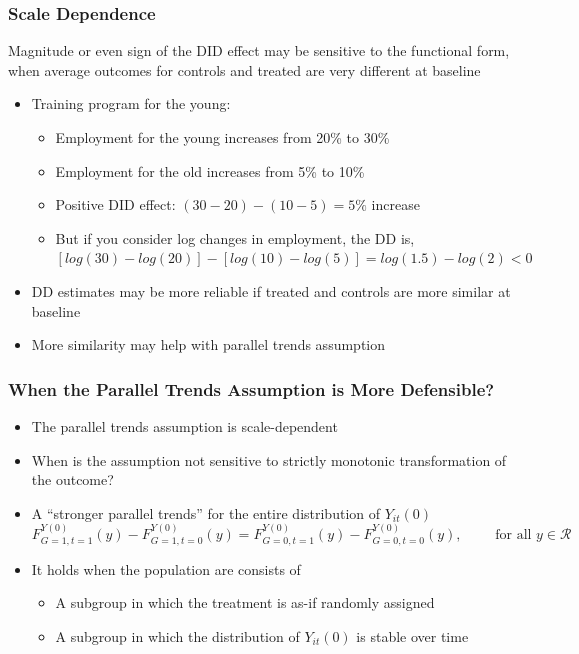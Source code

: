 \documentclass[xcolor=svgnames,9pt,english, aspectratio=169]{beamer}
\begin{document}
\begin{frame}
  \frametitle{Scale Dependence}
Magnitude or even sign of the DID effect may be sensitive to the functional form, when average outcomes for controls and treated are very different at baseline
 \begin{itemize}\bigskip
 \item Training program for the young:\medskip
 \begin{itemize}
   \item Employment for the young increases from 20\% to 30\%
   \item Employment for the old increases from 5\% to 10\%
   \item Positive DID effect: $(30 - 20) - (10 - 5) = 5\%$ increase\medskip \pause
   \item But if you consider log changes in employment, the DD is,
$[log(30) - log(20)] - [log(10) - log(5)] = log(1.5)- log(2) < 0$
 \end{itemize}\bigskip
 \item DD estimates may be more reliable if treated and controls are more similar at baseline\medskip
 \item More similarity may help with parallel trends assumption
\end{itemize}
\end{frame}

\begin{frame}
  \frametitle{When the Parallel Trends Assumption is More Defensible?}
  \alert{\textcite{roth2023when}}
  \begin{itemize}[<+->]\itemsep1em
    \item The parallel trends assumption is scale-dependent
    \item When is the assumption not sensitive to strictly monotonic transformation of the outcome? 
    \item A ``stronger parallel trends'' for the entire distribution of $Y_{it}(0)$
    $$F^{Y(0)}_{G=1,t=1}(y) - F^{Y(0)}_{G=1,t=0}(y) = F^{Y(0)}_{G=0,t=1}(y) - F^{Y(0)}_{G=0,t=0}(y),\qquad \text{ for all } y \in \mathcal{R}$$
    \item It holds when the population are consists of\medskip
    \begin{itemize}\itemsep0.5em
      \item A subgroup in which the treatment is as-if randomly assigned
      \item A subgroup in which the distribution of $Y_{it}(0)$ is stable over time
    \end{itemize}
  \end{itemize}
  \end{frame}
\end{document}
